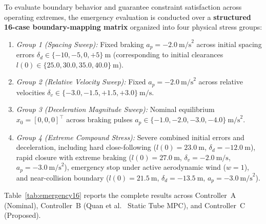 \documentclass[journal]{IEEEtran}
\begin{document}
To evaluate boundary behavior and guarantee constraint satisfaction across operating extremes, the emergency evaluation is conducted over a \textbf{structured 16-case boundary-mapping matrix} organized into four physical stress groups:
\begin{enumerate}
    \item \emph{Group 1 (Spacing Sweep):} Fixed braking $a_p = -2.0~\text{m/s}^2$ across initial spacing errors $\delta_d \in \{-10, -5, 0, +5\}~\text{m}$ (corresponding to initial clearances $l(0) \in \{25.0, 30.0, 35.0, 40.0\}~\text{m}$).
    \item \emph{Group 2 (Relative Velocity Sweep):} Fixed $a_p = -2.0~\text{m/s}^2$ across relative velocities $\delta_v \in \{-3.0, -1.5, +1.5, +3.0\}~\text{m/s}$.
    \item \emph{Group 3 (Deceleration Magnitude Sweep):} Nominal equilibrium $x_0 = [0, 0, 0]^\top$ across braking pulses $a_p \in \{-1.0, -2.0, -3.0, -4.0\}~\text{m/s}^2$.
    \item \emph{Group 4 (Extreme Compound Stress):} Severe combined initial errors and deceleration, including hard close-following ($l(0) = 23.0~\text{m}$, $\delta_d = -12.0~\text{m}$), rapid closure with extreme braking ($l(0) = 27.0~\text{m}$, $\delta_v = -2.0~\text{m/s}$, $a_p = -3.0~\text{m/s}^2$), emergency stop under active aerodynamic wind ($w = 1$), and near-collision boundary ($l(0) = 21.5~\text{m}$, $\delta_d = -13.5~\text{m}$, $a_p = -3.0~\text{m/s}^2$).
\end{enumerate}

Table~\ref{tab:emergency16} reports the complete results across Controller~A (Nominal), Controller~B (Quan et al.~\cite{Quan2024} Static Tube MPC), and Controller~C (Proposed).
\end{document}
